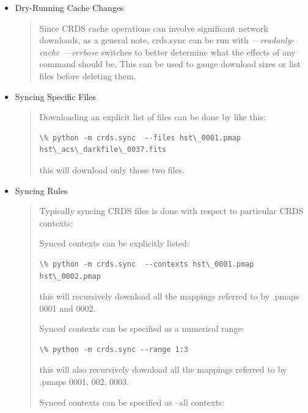 \documentclass[letterpaper,10pt,english]{sphinxmanual}
\begin{document}
\begin{itemize}
\item {} 
Dry-Running Cache Changes
\begin{quote}

Since CRDS cache operations can involve significant network downloads,  as a general note,
crds.sync can be run with \emph{---readonly-cache ---verbose} switches to better determine what
the effects of any command should be.   This can be used to gauge download sizes or list
files before deleting them.
\end{quote}

\item {} 
Syncing Specific Files
\begin{quote}

Downloading an explicit list of files can be done by like this:

\begin{Verbatim}[commandchars=\\\{\}]
\% python -m crds.sync  --files hst\_0001.pmap hst\_acs\_darkfile\_0037.fits
\end{Verbatim}

this will download only those two files.
\end{quote}

\item {} 
Syncing Rules
\begin{quote}

Typically syncing CRDS files is done with respect to particular CRDS contexts:

Synced contexts can be explicitly listed:

\begin{Verbatim}[commandchars=\\\{\}]
\% python -m crds.sync  --contexts hst\_0001.pmap hst\_0002.pmap
\end{Verbatim}

this will recursively download all the mappings referred to by .pmaps 0001 and 0002.

Synced contexts can be specified as a numerical range:

\begin{Verbatim}[commandchars=\\\{\}]
\% python -m crds.sync --range 1:3
\end{Verbatim}

this will also recursively download all the mappings referred to by .pmaps 0001, 002, 0003.

Synced contexts can be specified as --all contexts:


\end{quote}
\end{itemize}
\end{document}

